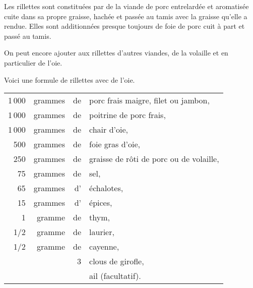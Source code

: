 Les rillettes sont constituées par de la viande de porc entrelardée et
aromatisée cuite dans sa propre graisse, hachée et passée au tamis avec la
graisse qu'elle a rendue. Elles sont additionnées presque toujours de foie de
porc cuit à part et passé au tamis.

On peut encore ajouter aux rillettes d'autres viandes, de la volaille et en
particulier de l’oie.

\medskip

Voici une formule de rillettes avec de l'oie.

\medskip

\footnotesize
\begin{longtable}{rrrp{16em}}
  1 000 & grammes & de & porc frais maigre, filet ou jambon,                                              \\
  1 000 & grammes & de & poitrine de porc frais,                                                          \\
  1 000 & grammes & de & chair d'oie,                                                                     \\
    500 & grammes & de & foie gras d'oie,                                                                 \\
    250 & grammes & de & graisse de rôti de porc ou de volaille,                                          \\
     75 & grammes & de & sel,                                                                             \\
     65 & grammes & d' & échalotes,                                                                       \\
     15 & grammes & d' & épices,                                                                          \\
      1 & gramme  & de & thym,                                                                            \\
    1/2 & gramme  & de & laurier,                                                                         \\
    1/2 & gramme  & de & cayenne,                                                                         \\
        &         &  3 & clous de girofle,                                                                \\
        &         &    & ail (facultatif).                                                                \\
\end{longtable}
\normalsize

